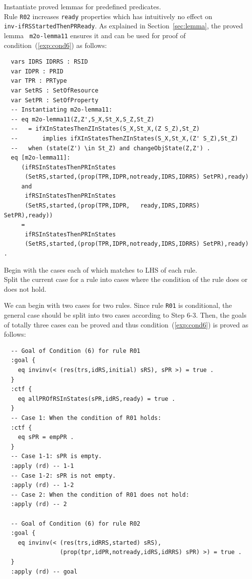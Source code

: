 \documentclass[12pt]{report}
\begin{document}
 Instantiate proved lemmas for predefined
predicates. \\ Rule {\tt R02} increases {\tt ready} properties which
has intuitively no effect on \\ {\tt inv-ifRSStartedThenPRReady}. As
explained in Section~\ref{sec:lemma}, the proved lemma {\tt
  m2o-lemma11} ensures it and can be used for proof of
condition~(\ref{exp:cond6}) as follows:
\small
\begin{verbatim}
  vars IDRS IDRRS : RSID 
  var IDPR : PRID
  var TPR : PRType
  var SetRS : SetOfResource
  var SetPR : SetOfProperty
  -- Instantiating m2o-lemma11:
  -- eq m2o-lemma11(Z,Z',S_X,St_X,S_Z,St_Z)
  --   = ifXInStatesThenZInStates(S_X,St_X,(Z S_Z),St_Z)
  --       implies ifXInStatesThenZInStates(S_X,St_X,(Z' S_Z),St_Z) 
  --   when (state(Z') \in St_Z) and changeObjState(Z,Z') .
  eq [m2o-lemma11]:
     (ifRSInStatesThenPRInStates
      (SetRS,started,(prop(TPR,IDPR,notready,IDRS,IDRRS) SetPR),ready)
     and
      ifRSInStatesThenPRInStates
      (SetRS,started,(prop(TPR,IDPR,   ready,IDRS,IDRRS) SetPR),ready))
     = 
      ifRSInStatesThenPRInStates
      (SetRS,started,(prop(TPR,IDPR,notready,IDRS,IDRRS) SetPR),ready) .
\end{verbatim}
\normalsize

\vspace{0.3cm}
 Begin with the cases each of which matches to
LHS of each rule. \\ 
 Split the current case for a rule into
cases where the condition of the rule does or does not hold. 

We can begin with two cases for two rules. Since rule {\tt R01} is
conditional, the general case should be split into two cases according
to Step 6-3. Then, the goals of totally three cases can be proved and
thus condition~(\ref{exp:cond6}) is proved as follows:
\small
\begin{verbatim}
  -- Goal of Condition (6) for rule R01
  :goal {
    eq invinv(< (res(trs,idRS,initial) sRS), sPR >) = true .
  }
  :ctf {
    eq allPROfRSInStates(sPR,idRS,ready) = true .
  }
  -- Case 1: When the condition of R01 holds:
  :ctf {
    eq sPR = empPR .
  }
  -- Case 1-1: sPR is empty.
  :apply (rd) -- 1-1
  -- Case 1-2: sPR is not empty.
  :apply (rd) -- 1-2
  -- Case 2: When the condition of R01 does not hold:
  :apply (rd) -- 2

  -- Goal of Condition (6) for rule R02
  :goal {
    eq invinv(< (res(trs,idRRS,started) sRS),
                (prop(tpr,idPR,notready,idRS,idRRS) sPR) >) = true .
  }
  :apply (rd) -- goal
\end{verbatim}
\normalsize
\end{document}
